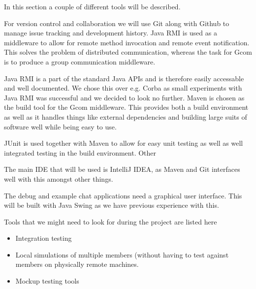 	In this section a couple of different tools will be described.

		For version control and collaboration we will use Git along with Github
		to manage issue tracking and development history.
		Java RMI is used as a middleware to allow for remote method invocation and remote event notification.
		This solves the problem of distributed communication, whereas the task for Gcom is to produce a group communication middleware.

		Java RMI is a part of the standard Java APIs and is therefore easily accessable and well documented.
		We chose this over e.g. Corba as small experiments with Java RMI was
		successful and we decided to look no further.
		Maven is chosen as the build tool for the Gcom middleware.
		This provides both a build environment as well as it
		handles things like external dependencies and building
		large suits of software well while being easy to use.

		JUnit is used together with Maven to allow for easy unit testing as 
		well as well integrated testing in the build environment.
		Other 

		The main IDE that will be used is IntelliJ IDEA, as Maven and Git interfaces well with this amongst other things.

		The debug and example chat applications need a graphical user interface.
		This will be built with Java Swing as we have previous experience with this.

		Tools that we might need to look for during the project are listed here
		\begin{itemize}
			\item Integration testing
			\item Local simulations of multiple members (without having to test against members on physically remote machines.
			\item Mockup testing tools
		\end{itemize}
